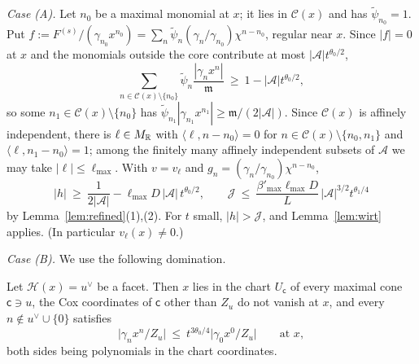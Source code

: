 \emph{Case (A).} Let $n_0$ be a maximal monomial at $x$; it lies in $\mathcal C(x)$ and has $\tilde\psi_{n_0}=1$. Put
$f:=F^{(s)}/(\gamma_{n_0}x^{n_0})=\sum_n\tilde\psi_n(\gamma_n/\gamma_{n_0})\chi^{n-n_0}$, regular near $x$. Since $|f|=0$ at
$x$ and the monomials outside the core contribute at most $|\mathcal A|t^{\theta_0/2}$,
\[
\sum_{n\in\mathcal C(x)\setminus\{n_0\}}\tilde\psi_n\frac{|\gamma_nx^n|}{\mathfrak m}\ \ge\ 1-|\mathcal A|t^{\theta_0/2},
\]
so some $n_1\in\mathcal C(x)\setminus\{n_0\}$ has $\tilde\psi_{n_1}|\gamma_{n_1}x^{n_1}|\ge\mathfrak m/(2|\mathcal A|)$. Since
$\mathcal C(x)$ is affinely independent, there is $\ell\in M_\mathbb R$ with $\langle\ell,n-n_0\rangle=0$ for
$n\in\mathcal C(x)\setminus\{n_0,n_1\}$ and $\langle\ell,n_1-n_0\rangle=1$; among the finitely many affinely independent
subsets of $\mathcal A$ we may take $|\ell|\le\ell_{\max}$. With $v=v_\ell$ and $g_n=(\gamma_n/\gamma_{n_0})\chi^{n-n_0}$,
\[
|h|\ \ge\ \frac1{2|\mathcal A|}-\ell_{\max}D\,|\mathcal A|\,t^{\theta_0/2},\qquad \mathcal J\ \le\
\frac{\beta'_{\max}\ell_{\max}D}{L}\,|\mathcal A|^{3/2}t^{\theta_1/4}
\]
by Lemma~\ref{lem:refined}(1),(2). For $t$ small, $|h|>\mathcal J$, and Lemma~\ref{lem:wirt} applies. (In particular
$v_\ell(x)\neq0$.)

\emph{Case (B).} We use the following domination.

\begin{lemma}\label{lem:slide}
Let $\mathcal H(x)=u^\vee$ be a facet. Then $x$ lies in the chart $U_{\mathsf c}$ of every maximal cone $\mathsf c\ni u$, the Cox
coordinates of $\mathsf c$ other than $Z_u$ do not vanish at $x$, and every $n\notin u^\vee\cup\{0\}$ satisfies
\[
\bigl|\gamma_nx^n/Z_u\bigr|\ \le\ t^{3\theta_0/4}\bigl|\gamma_0x^0/Z_u\bigr|\qquad\text{at }x,
\]
both sides being polynomials in the chart coordinates.
\end{lemma}

